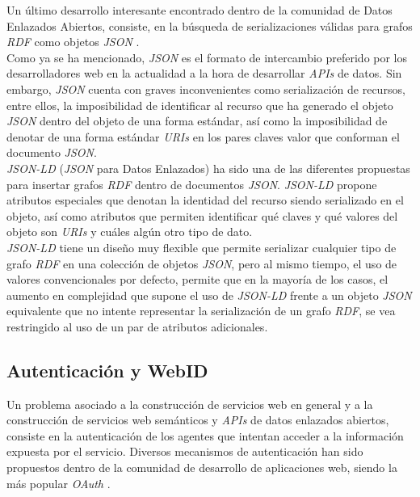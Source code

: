Un \'ultimo desarrollo interesante encontrado dentro de la comunidad de Datos Enlazados Abiertos, consiste, en la b\'usqueda de serializaciones v\'alidas para grafos \textit{RDF} como objetos \textit{JSON} \cite{json}.\\
Como ya se ha mencionado, \textit{JSON} es el formato de intercambio preferido por los desarrolladores web en la actualidad a la hora de desarrollar \textit{APIs} de datos. Sin embargo, \textit{JSON} cuenta con graves inconvenientes como serializaci\'on de recursos, entre ellos, la imposibilidad de identificar al recurso que ha generado el objeto \textit{JSON} dentro del objeto de una forma est\'andar, as\'i como la imposibilidad de denotar de una forma est\'andar \textit{URIs} en los pares claves valor que conforman el documento \textit{JSON}.\\
\textit{JSON-LD} (\textit{JSON} para Datos Enlazados) \cite{jsonld} ha sido una de las diferentes propuestas \cite{alexander2008rdf} para insertar grafos \textit{RDF} dentro de documentos \textit{JSON}. \textit{JSON-LD} propone atributos especiales que denotan la identidad del recurso siendo serializado en el objeto, as\'i como atributos que permiten identificar qu\'e claves y qu\'e valores del objeto son \textit{URIs} y cu\'ales alg\'un otro tipo de dato.\\
\textit{JSON-LD} tiene un dise\~no muy flexible que permite serializar cualquier tipo de grafo \textit{RDF} en una colecci\'on de objetos \textit{JSON}, pero al mismo tiempo, el uso de valores convencionales por defecto, permite que en la mayor\'ia de los casos, el aumento en complejidad que supone el uso de \textit{JSON-LD} frente a un objeto \textit{JSON} equivalente que no intente representar la serializaci\'on de un grafo \textit{RDF}, se vea restringido al uso de un par de atributos adicionales.\\

\subsection{Autenticaci\'on y WebID}

Un problema asociado a la construcci\'on de servicios web en general y a la construcci\'on de servicios web sem\'anticos y \textit{APIs} de datos enlazados abiertos, consiste en la autenticaci\'on de los agentes que intentan acceder a la informaci\'on expuesta por el servicio.
Diversos mecanismos de autenticaci\'on han sido propuestos dentro de la comunidad de desarrollo de aplicaciones web, siendo la m\'as popular \textit{OAuth} \cite{hammer2010oauth}.

